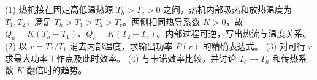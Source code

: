 (1) 热机接在固定高低温热源 \(T_h>T_c>0\) 之间，热机内部吸热和放热温度为 \(T_1,T_2\)，满足 \(T_h>T_1>T_2>T_c\)。两侧相同热导系数 \(K>0\)，故 \(\dot Q_h=K(T_h-T_1)\)、\(\dot Q_c=K(T_2-T_c)\)。内部过程可逆，写出热流与温度关系。
(2) 以 \(r=T_2/T_1\) 消去内部温度，求输出功率 \(P(r)\) 的精确表达式。
(3) 对可行 \(r\) 求最大功率工作点及此时效率。
(4) 与卡诺效率比较，并讨论 \(T_c\to T_h\) 和传热系数 \(K\) 翻倍时的趋势。
